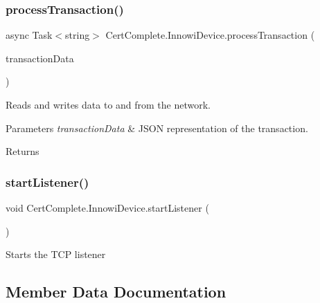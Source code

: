 \subsubsection{\texorpdfstring{process\+Transaction()}{processTransaction()}}
{\footnotesize\ttfamily async Task$<$string$>$ Cert\+Complete.\+Innowi\+Device.\+process\+Transaction (\begin{DoxyParamCaption}\item[{Newtonsoft.\+Json.\+Linq.\+J\+Token}]{transaction\+Data }\end{DoxyParamCaption})\hspace{0.3cm}{\ttfamily [inline]}}



Reads and writes data to and from the network. 


\begin{DoxyParams}{Parameters}
{\em transaction\+Data} & J\+S\+ON representation of the transaction.\\
\hline
\end{DoxyParams}
\begin{DoxyReturn}{Returns}

\end{DoxyReturn}
\mbox{\label{class_cert_complete_1_1_innowi_device_a1473af2c3c1eed973e430b84bebfd625}} 
\subsubsection{\texorpdfstring{start\+Listener()}{startListener()}}
{\footnotesize\ttfamily void Cert\+Complete.\+Innowi\+Device.\+start\+Listener (\begin{DoxyParamCaption}{ }\end{DoxyParamCaption})\hspace{0.3cm}{\ttfamily [inline]}}



Starts the T\+CP listener 



\subsection{Member Data Documentation}
\mbox{\label{class_cert_complete_1_1_innowi_device_a4adf7808e8911c0f055f8916dab3b8ee}} 
